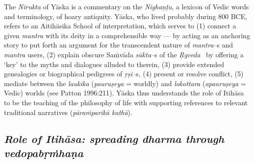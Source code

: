 The \textit{Nirukta} of Yāska is a commentary on the \textit{Nighaṇṭu}, a lexicon of Vedic words and terminology, of hoary antiquity. Yāska, who lived probably during 800 BCE, refers to an Aitihāsika School of interpretation, which serves to (1) connect a given \textit{mantra} with its deity in a comprehensible way — by acting as an anchoring story to put forth an argument for the transcendent nature of \textit{mantra}–s and \textit{mantra} users, (2) explain obscure Saṁvāda \textit{sūkta}–s of the \textit{Ṛgveda}  by offering a ‘key’ to the myths and dialogues alluded to therein, (3) provide extended genealogies or biographical pedigrees of \textit{ṛṣi–}s, (4) present or resolve conflict, (5) mediate between the \textit{laukika} (\textit{pauruṣeya} = worldly) and \textit{lokottara} (\textit{apauruṣeya} = Vedic) worlds (see Patton 1996:211). Yāska thus understands the role of Itihāsa to be the teaching of the philosophy of life with supporting references to relevant traditional narratives (\textit{pāraṁparikā kathā}).


\subsection*{\textit{Role of Itihāsa: spreading dharma through vedopabṛṁhaṇa}}

